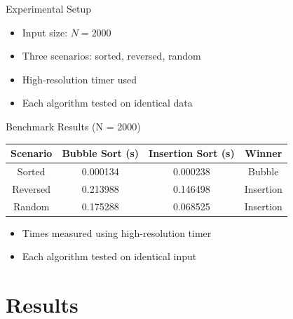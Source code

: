 \documentclass[aspectratio=169]{beamer}
\begin{document}
\begin{frame}{Experimental Setup}
\begin{itemize}
    \item<1-> Input size: $N = 2000$
    \item<2-> Three scenarios: sorted, reversed, random
    \item<3-> High-resolution timer used
    \item<4-> Each algorithm tested on identical data
\end{itemize}
\end{frame}



\begin{frame}{Benchmark Results (N = 2000)}
\begin{center}
\begin{tabular}{|c|c|c|c|}
\hline
Scenario & Bubble Sort (s) & Insertion Sort (s) & Winner \\
\hline
Sorted & 0.000134 & 0.000238 & Bubble \\
Reversed & 0.213988 & 0.146498 & Insertion \\
Random & 0.175288 & 0.068525 & Insertion \\

\hline
\end{tabular}
\end{center}

\vspace{0.3cm}

\begin{itemize}
    \item<1-> Times measured using high-resolution timer
    \item<2-> Each algorithm tested on identical input
\end{itemize}
\end{frame}
\section{Results}
\end{document}
